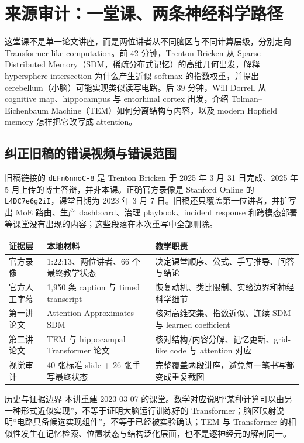 \documentclass[a4paper]{article}
\begin{document}
\makecscover

\section{来源审计：一堂课、两条神经科学路径}

这堂课不是单一论文讲座，而是两位讲者从不同脑区与不同计算层级，分别走向 Transformer-like computation。前 42 分钟，Trenton Bricken 从 Sparse Distributed Memory（SDM，稀疏分布式记忆）的高维几何出发，解释 hypersphere intersection 为什么产生近似 softmax 的指数权重，并提出 cerebellum（小脑）可能实现类似读写电路。后 39 分钟，Will Dorrell 从 cognitive map、hippocampus 与 entorhinal cortex 出发，介绍 Tolman--Eichenbaum Machine（TEM）如何分离结构与内容，以及 modern Hopfield memory 怎样把它改写成 attention。

\subsection{纠正旧稿的错误视频与错误范围}

旧稿链接的 \texttt{dEFn6nnoC-8} 是 Trenton Bricken 于 2025 年 3 月 31 日完成、2025 年 5 月上传的博士答辩，并非本课。正确官方录像是 Stanford Online 的 \texttt{L4DC7e6g2iI}，课堂日期为 2023 年 3 月 7 日。旧稿还只覆盖第一位讲者，并扩写出 MoE 路由、生产 dashboard、治理 playbook、incident response 和跨模态部署等课堂没有出现的内容；这些段落在本次重写中全部删除。

\begin{longtable}{@{}L{0.18\textwidth}L{0.29\textwidth}L{0.41\textwidth}@{}}
\toprule
证据层 & 本地材料 & 教学职责 \\
\midrule
官方录像 & 1:22:13、两位讲者、66 个最终教学状态 & 决定课堂顺序、公式、手写推导、问答与结论 \\
官方人工字幕 & 1,950 条 caption 与 timed transcript & 恢复动机、类比限制、实验边界和神经科学细节 \\
第一讲论文 & Attention Approximates SDM & 核对高维交集、指数近似、连续 SDM 与 learned coefficient \\
第二讲论文 & TEM 与 hippocampal Transformer 论文 & 核对结构/内容分解、记忆更新、grid-like code 与 attention 对应 \\
视觉审计 & 40 张标准 slide + 26 张手写最终状态 & 完整覆盖两段讲座，避免每一笔书写都变成重复截图 \\
\bottomrule
\end{longtable}

\begin{warningbox}{历史与证据边界}
本讲重建 2023-03-07 的课堂。数学对应说明“某种计算可以由另一种形式近似实现”，不等于证明大脑运行训练好的 Transformer；脑区映射说明“电路具备候选实现组件”，不等于已经被实验确认；TEM 与 Transformer 的相似性发生在记忆检索、位置状态与结构泛化层面，也不是逐神经元的解剖同一。
\end{warningbox}
\end{document}
